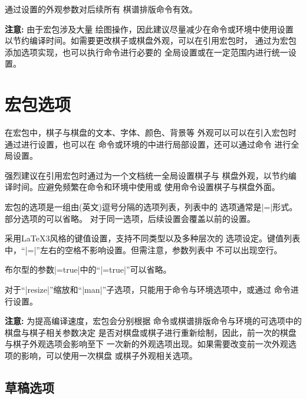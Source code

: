 \documentclass[full]{l3doc}
\begin{document}
\begin{documentation}
  通过设置的外观参数对后续所有
  棋谱排版命令有效。

  \textbf{\textsf{注意: }}由于宏包涉及大量
  绘图操作，因此建议尽量减少在命令或环境中使用设置%
  以节约编译时间。如需要更改棋子或棋盘外观，可以在引用宏包时，
  通过为宏包添加选项实现，也可以执行命令进行必要的
  全局设置或在一定范围内进行统一设置。



\section{宏包选项}

在宏包中，棋子与棋盘的文本、字体、颜色、背景等
外观可以可以在引入宏包时通过进行设置，也可以在
命令或环境的中进行局部设置，还可以通过命令
进行全局设置。

强烈建议在引用宏包时通过为一个文档统一全局设置棋子与
棋盘外观，以节约编译时间。应避免频繁在命令和环境中使用或
使用命令设置棋子与棋盘外面。

宏包的选项是一组由(英文)逗号分隔的选项列表，列表中的
选项通常是|=|形式。部分选项的可以省略。
对于同一选项，后续设置会覆盖以前的设置。

采用\LaTeX3风格的键值设置，支持不同类型以及多种层次的
选项设定。键值列表中，``|=|''左右的空格不影响设置。但需注意，参数列表中%
\textsf{不可以出现空行}。

布尔型的参数|=true|中的``|=true|''可以省略。

对于``|resize|''缩放和``|man|''子选项，只能用于命令与环境选项中，或通过
命令进行设置。

\textbf{\textsf{注意: }}为提高编译速度，宏包会分别根据%
命令或棋谱排版命令与环境的可选项中的棋盘与棋子相关参数决定
是否对棋盘或棋子进行重新绘制，因此，前一次的棋盘与棋子外观选项会影响至下
一次新的外观选项出现。如果需要改变前一次外观选项的影响，可以使用一次棋盘
或棋子外观相关选项。

\subsection{草稿选项}


\end{documentation}
\end{document}
